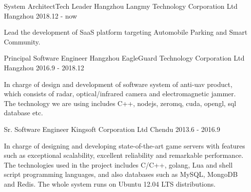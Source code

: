 

\begin{cventries}

  \cventry
    {System Architect{\enskip\cdotp\enskip}Tech Leader} %
    {Hangzhou Langmy Technology Corporation Ltd} %
    {Hangzhou} %
    {2018.12 - now} %
    {
      \begin{cvitems} %
        \item {Lead the development of SaaS platform targeting Automobile Parking and Smart Community.}
      \end{cvitems}
    }

  \cventry
    {Principal Software Engineer} %
    {Hangzhou EagleGuard Technology Corporation Ltd} %
    {Hangzhou} %
    {2016.9 - 2018.12} %
    {
      \begin{cvitems} %
        \item {In charge of design and development of software system of anti-uav product, which consists of radar, optical/infrared camera and electromagnetic jammer. The technology we are using includes C++, nodejs, zeromq, cuda, opengl, sql database etc.}
      \end{cvitems}
    }

  \cventry
    {Sr. Software Engineer} %
    {Kingsoft Corporation Ltd} %
    {Chendu} %
    {2013.6 - 2016.9} %
    {
      \begin{cvitems} %
        \item {In charge of designing and developing state-of-the-art game servers with features such as exceptional scalability, excellent reliability and remarkable performance. The technologies used in the project includes C/C++, golang, Lua and shell script programming languages, and also databases such as MySQL, MongoDB and Redis. The whole system runs on Ubuntu 12.04 LTS distributions.}
      \end{cvitems}
    }


\end{cventries}
